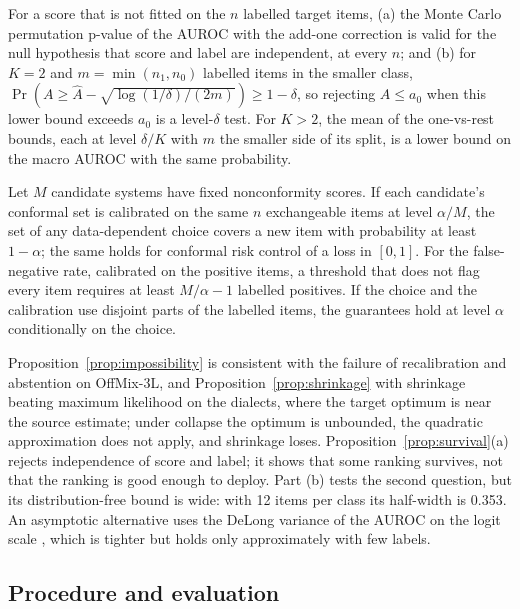 \begin{proposition}
\label{prop:survival}
For a score that is not fitted on the $n$ labelled target items, (a) the Monte Carlo permutation p-value of the AUROC
with the add-one correction is valid for the null hypothesis that score and label are independent, at every $n$; and
(b) for $K = 2$ and $m = \min(n_1, n_0)$ labelled items in the smaller class,
$\Pr(A \ge \hat A - \sqrt{\log(1/\delta)/(2m)}) \ge 1 - \delta$, so rejecting $A \le a_0$ when this lower bound exceeds
$a_0$ is a level-$\delta$ test. For $K > 2$, the mean of the one-vs-rest bounds, each at level $\delta/K$ with $m$
the smaller side of its split, is a lower bound on the macro AUROC with the same probability.
\end{proposition}

\begin{proposition}
\label{prop:selection}
Let $M$ candidate systems have fixed nonconformity scores. If each candidate's conformal set is calibrated on the same
$n$ exchangeable items at level $\alpha/M$, the set of any data-dependent choice covers a new item with probability at
least $1 - \alpha$; the same holds for conformal risk control of a loss in $[0, 1]$. For the false-negative rate,
calibrated on the positive items, a threshold that does not flag every item requires at least $M/\alpha - 1$ labelled
positives. If the choice and the calibration use disjoint parts of the labelled items, the guarantees hold at level
$\alpha$ conditionally on the choice.
\end{proposition}

Proposition~\ref{prop:impossibility} is consistent with the failure of recalibration and abstention on OffMix-3L, and
Proposition~\ref{prop:shrinkage} with shrinkage beating maximum likelihood on the dialects, where the target optimum is
near the source estimate; under collapse the optimum is unbounded, the quadratic approximation does not apply, and
shrinkage loses. Proposition~\ref{prop:survival}(a) rejects independence of score and label; it shows that some
ranking survives, not that the ranking is good enough to deploy. Part (b) tests the second question, but its
distribution-free bound is wide: with 12 items per class its half-width is 0.353. An asymptotic alternative uses the
DeLong variance of the AUROC on the logit scale \citep{qin2008comparison}, which is tighter but holds only
approximately with few labels.

\subsection{Procedure and evaluation}
\label{sec:triage-procedure}

